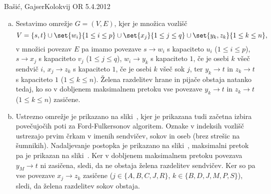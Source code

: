 \begin{naloga}{Bašić, Gajser}{Kolokvij OR 5.4.2012}
\begin{odgovor}
\begin{enumerate}[(a)]
\item Sestavimo omrežje $G = (V, E)$, kjer je množica vozlišč
$$
V = \{s, t\} \cup \set{w_i}{1 \le i \le p}
    \cup \set{x_j}{1 \le j \le q} \cup \set{y_k, z_k}{1 \le k \le n},
$$
v množici povezav $E$ pa imamo povezave
$s \to w_i$ s kapaciteto $u_i$ ($1 \le i \le p$),
$s \to x_j$ s kapaciteto $v_j$ ($1 \le j \le q$),
$w_i \to y_k$ s kapaciteto $1$, če je osebi $k$ všeč sendvič $i$,
$x_j \to z_k$ s kapaciteto $1$, če je osebi $k$ všeč sok $j$,
ter $y_k \to t$ in $z_k \to t$ s kapaciteto $1$ ($1 \le k \le n$).
Želena razdelitev hrane in pijače obstaja natanko tedaj,
ko so v dobljenem maksimalnem pretoku
vse povezave $y_k \to t$ in $z_k \to t$ ($1 \le k \le n$) zasičene.

\item Ustrezno omrežje je prikazano na sliki~,
kjer je prikazana tudi začetna izbira povečujočih poti
za Ford-Fulkersonov algoritem.
Oznake v indeksih voz\-lišč ustrezajo prvim črkam
v imenih sendvičev, sokov in oseb (brez strešic na šumnikih).
Nadaljevanje postopka je prikazano na sliki~,
maksimalni pretok pa je prikazan na sliki~.
Ker v dobljenem maksimalnem pretoku povezava $y_M \to t$ ni zasičena,
sledi, da ne obstaja želena razdelitev sendvičev.
Ker so pa vse povezave $x_j \to z_k$ zasičene
($j \in \{A, B, C, J, R\}$, $k \in \{B, D, J, M, P, S\}$),
sledi, da želena razdelitev sokov obstaja.
\end{enumerate}

\begin{slika}[p]
\end{slika}
\begin{slika}[p]
\end{slika}
\begin{slika}[p]
\end{slika}
\end{odgovor}
\end{naloga}
